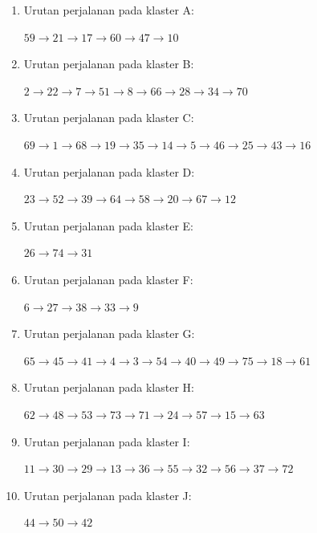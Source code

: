 \begin{enumerate}
\item Urutan perjalanan pada klaster A:

$59\rightarrow21\rightarrow17\rightarrow60\rightarrow47\rightarrow10$

\item Urutan perjalanan pada klaster B:

$2\rightarrow22\rightarrow7\rightarrow51\rightarrow8\rightarrow66\rightarrow28\rightarrow34\rightarrow70$

\item Urutan perjalanan pada klaster C:

$69\rightarrow1\rightarrow68\rightarrow19\rightarrow35\rightarrow14\rightarrow5\rightarrow46\rightarrow25\rightarrow43\rightarrow16$

\item Urutan perjalanan pada klaster D:

$23\rightarrow52\rightarrow39\rightarrow64\rightarrow58\rightarrow20\rightarrow67\rightarrow12$

\item Urutan perjalanan pada klaster E:

$26\rightarrow74\rightarrow31$

\item Urutan perjalanan pada klaster F:

$6\rightarrow27\rightarrow38\rightarrow33\rightarrow9$

\item Urutan perjalanan pada klaster G:

$65\rightarrow45\rightarrow41\rightarrow4\rightarrow3\rightarrow54\rightarrow40\rightarrow49\rightarrow75\rightarrow18\rightarrow61$

\item Urutan perjalanan pada klaster H:

$62\rightarrow48\rightarrow53\rightarrow73\rightarrow71\rightarrow24\rightarrow57\rightarrow15\rightarrow63$

\item Urutan perjalanan pada klaster I:

$11\rightarrow30\rightarrow29\rightarrow13\rightarrow36\rightarrow55\rightarrow32\rightarrow56\rightarrow37\rightarrow72$

\item Urutan perjalanan pada klaster J:

$44\rightarrow50\rightarrow42$

\end{enumerate}

